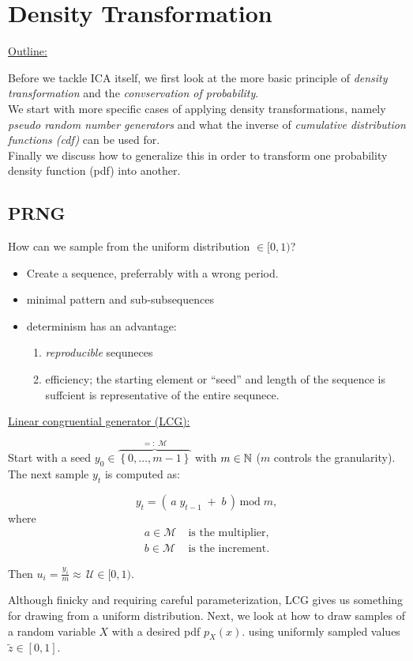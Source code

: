 \section{Density Transformation}

\underline{Outline:}

Before we tackle ICA itself, we first look at the more basic principle of \emph{density transformation} and 
the \emph{convservation of probability}.\\
We start with more specific cases of applying density transformations, 
namely \emph{pseudo random number generators} and what the inverse of \emph{cumulative distribution functions (cdf)} can be used for.\\
Finally we discuss how to generalize this in order to transform one probability density function (pdf) into another.

\subsection{PRNG}

How can we sample from the uniform distribution $\in \lbrack0, 1)$?

\begin{itemize}
\item Create a sequence, preferrably with a wrong period.
\item minimal pattern and sub-subsequences
\item determinism has an advantage:
\begin{enumerate}
	\item \emph{reproducible} sequneces
	\item efficiency; the starting element or ``seed'' and length of the sequence is suffcient is representative of the entire sequnece.
\end{enumerate}
\end{itemize}

\underline{Linear congruential generator (LCG):}

Start with a seed $y_0 \in \overbrace{\left\{0,\ldots,m-1\right\}}^{=:\;\mathcal{M}}$ with $m \in \mathbb{N}$ ($m$ controls the granularity). 
The next sample $y_t$ is computed as:

\begin{equation}
y_t = \left( \, a \; y_{t-1} \; + \; b \, \right) \, \text{mod} \; m,
\end{equation}
where\\[-0.7cm]
\begin{align*}
a \in \mathcal{M}&\; \text{is the multiplier,} \\
b \in \mathcal{M}&\; \text{is the increment.}
\end{align*}

Then $u_i = \frac{y_i}{m} \approx \,\mathcal{U} \in \lbrack0, 1)$.

Although finicky and requiring careful parameterization, LCG gives us something for drawing from a uniform distribution. 
Next, we look at how to draw samples of a random variable $X$ with a desired pdf $p_X(x)$. 
using uniformly sampled values $\tilde z \in [0,1]$.

